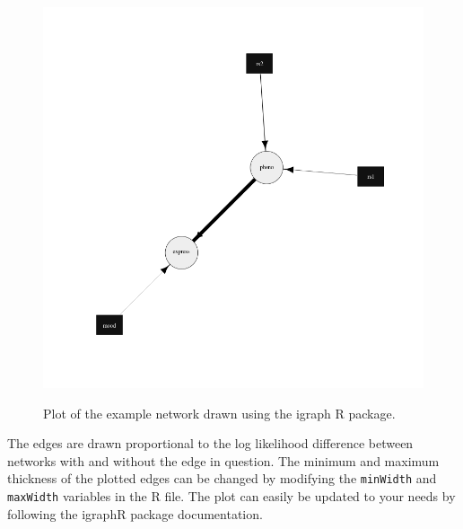 \documentclass[a4paper,12pt]{article}
\newcommand{\code}[1]{{\footnotesize{{\tt #1}}}}
\begin{document}
{\begin{figure}[ht]
{\begin{center}
{\includegraphics[width=400pt]{exampleGraph.png}}
\caption{Plot of the example network drawn using the igraph R package.}
\label{plot1-fig}
\end{center}}
\end{figure}
}

The edges are drawn proportional to the log likelihood difference between networks with and without the edge in question. The minimum and maximum thickness of the plotted edges can be changed by modifying the \code{minWidth} and \code{maxWidth} variables in the R file. The plot can easily be updated to your needs by following the igraphR package documentation. 
\end{document}
